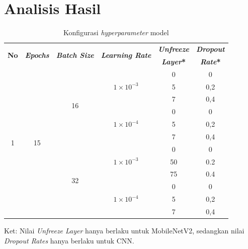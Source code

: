 \section{Analisis Hasil}
\begin{table}[H]
\centering
\caption{Konfigurasi \textit{hyperparameter} model}
\label{tab:konfigurasi-hyperparameter-gabungan}
\begin{tabular}{|c|c|c|c|c|c|}
\hline
\multirow{2}{*}{\textbf{No}} & 
\multirow{2}{*}{\textbf{\textit{Epochs}}} &
\multirow{2}{*}{\textbf{\textit{Batch Size}}} &
\multirow{2}{*}{\textbf{\textit{Learning Rate}}} &
\multicolumn{1}{c|}{\textbf{\textit{Unfreeze}}} 
  & \multicolumn{1}{c|}{\textbf{\textit{Dropout}}} \\ 
  &  &  &  & \textbf{\textit{Layer}*} & \textbf{\textit{Rate}*} \\ \hline

\multirow{12}{*}{1} 
  & \multirow{12}{*}{15} 
  & \multirow{6}{*}{16} 
  & \multirow{3}{*}{$1 \times 10^{-3}$} 
      & 0  & 0 \\ \cline{5-6}
  &  &  &  & 5 & 0,2 \\ \cline{5-6}
  &  &  &  & 7 & 0,4 \\ \cline{4-6}
  &  &  & \multirow{3}{*}{$1 \times 10^{-4}$} 
      & 0  & 0 \\ \cline{5-6}
  &  &  &  & 5 & 0,2 \\ \cline{5-6}
  &  &  &  & 7 & 0,4 \\ \cline{3-6}

  &  & \multirow{6}{*}{32} 
  & \multirow{3}{*}{$1 \times 10^{-3}$} 
      & 0  & 0 \\ \cline{5-6}
  &  &  &  & 50 & 0.2 \\ \cline{5-6}
  &  &  &  & 75 & 0.4 \\ \cline{4-6}
  &  &  & \multirow{3}{*}{$1 \times 10^{-4}$} 
      & 0  & 0\\ \cline{5-6}
  &  &  &  & 5 & 0,2 \\ \cline{5-6}
  &  &  &  & 7 & 0,4 \\ \hline
\end{tabular}

\vspace{0.5em}
\begin{minipage}{0.9\textwidth}
\footnotesize Ket: Nilai \textit{Unfreeze Layer} hanya berlaku untuk MobileNetV2, sedangkan nilai \textit{Dropout Rates} hanya berlaku untuk CNN.
\end{minipage}
\end{table}

